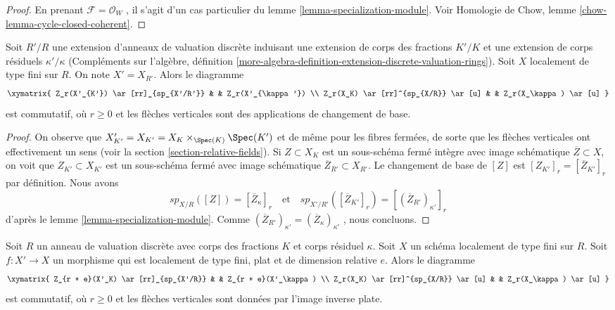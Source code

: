 \begin{proof} En
 prenant  $\mathcal{F} = \mathcal{O}_W$ , il s'agit d'un cas particulier du
 lemme  \ref{lemma-specialization-module}. Voir 
Homologie de Chow, lemme \ref{chow-lemma-cycle-closed-coherent}. 
\end{proof} 

\begin{lemma} 
\label{lemma-specialization-extension} 
Soit  $R'/R$  une extension d'anneaux de valuation discrète induisant une extension de corps des
 fractions  $K'/K$  et une extension de corps résiduels $\kappa'/\kappa$
  (Compléments sur l'algèbre, définition  
\ref{more-algebra-definition-extension-discrete-valuation-rings}). 
Soit  $X$ localement de type fini sur  $R$. On note  $X' = X_{R'}$.
 Alors le diagramme 
$$
\xymatrix{
Z_r(X'_{K'}) \ar[rr]_{sp_{X'/R'}} & & Z_r(X'_{\kappa'}) \\
Z_r(X_K) \ar[rr]^{sp_{X/R}} \ar[u] & & Z_r(X_\kappa) \ar[u]
}
$$
 est commutatif, où  $r \geq 0$  et les flèches verticales sont des applications de changement de base. 
\end{lemma} 

\begin{proof} 
On observe que  $X'_{K'} = X_{K'} = X_K \times_{\Spec(K)} \Spec(K')$
  et de même pour les fibres fermées, de sorte que les flèches verticales ont effectivement
 un sens (voir la section  \ref{section-relative-fields}).
 Si  $Z \subset X_K$  est un sous-schéma fermé intègre 
avec image schématique  $\overline{Z} \subset X$, on voit que  
$Z_{K'} \subset X_{K'}$  est un sous-schéma fermé avec image schématique
  $\overline{Z}_{R'} \subset X_{R'}$. Le changement de base de  
$[Z]$ est  $[Z_{K'}]_r = [\overline{Z}_{K'}]_r$  par définition. Nous avons 
$$
sp_{X/R}([Z]) = [\overline{Z}_\kappa]_r
\quad\text{et}\quad
sp_{X'/R'}([\overline{Z}_{K'}]_r) = [(\overline{Z}_{R'})_{\kappa'}]_r
$$
 d'après le lemme \ref{lemma-specialization-module}. Comme  
$(\overline{Z}_{R'})_{\kappa'} = (\overline{Z}_\kappa)_{\kappa'}$
 , nous concluons. 
\end{proof} 

\begin{lemma} 
\label{lemma-specialization-flat-pullback} 
Soit  $R$  un anneau de valuation discrète avec corps des fractions $K$  et corps résiduel  
$\kappa$. Soit  $X$  un schéma localement de type fini sur  $R$. 
Soit  $f : X' \to X$  un morphisme qui est localement de type fini, plat 
et de dimension relative  $e$. Alors le diagramme 
$$
\xymatrix{
Z_{r + e}(X'_K) \ar[rr]_{sp_{X'/R}} & & Z_{r + e}(X'_\kappa) \\
Z_r(X_K) \ar[rr]^{sp_{X/R}} \ar[u] & & Z_r(X_\kappa) \ar[u]
}
$$
 est commutatif, où  $r \geq 0$  et les flèches verticales sont données par 
l'image inverse plate. 
\end{lemma} 

